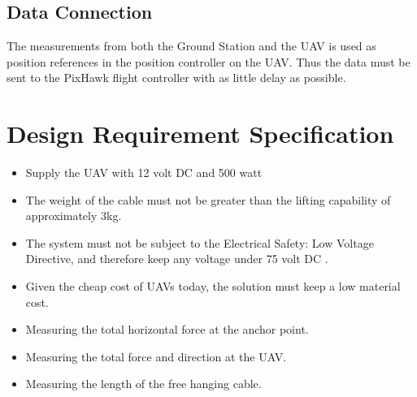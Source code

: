 \subsection{Data Connection}
The measurements from both the Ground Station and the UAV is used as position references in the position controller on the UAV. Thus the data must be sent to the PixHawk flight controller with as little delay as possible.

\newpage
\section{Design Requirement Specification}
\begin{itemize}
\item Supply the UAV with 12 volt DC and 500 watt
\item The weight of the cable must not be greater than the lifting capability of approximately 3kg.
\item The system must not be subject to the Electrical Safety: Low Voltage Directive, and therefore keep any voltage under 75 volt DC \cite{Parliament2006}.
\item Given the cheap cost of UAVs today, the solution must keep a low material cost.
\item Measuring the total horizontal force at the anchor point.
\item Measuring the total force and direction at the UAV.
\item Measuring the length of the free hanging cable.
\end{itemize}





